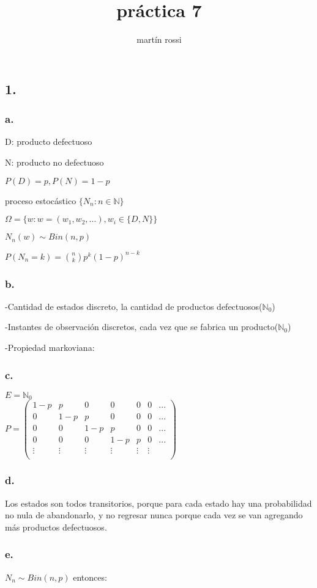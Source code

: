 \documentclass[12pt,fleqn]{article}
\title{práctica 7}
\author{martín rossi}
\date{}
\begin{document}
\maketitle
\subsection*{1.}
\subsubsection*{a.}
D: producto defectuoso

N: producto no defectuoso

$P(D)=p, P(N)=1-p$

proceso estocástico $\{N_n:n\in\mathbb{N}\}$

$\Omega=\{w:w=(w_1,w_2,...), w_i\in\{D,N\}\}$

$N_n(w)\sim Bin(n,p)$

$P(N_n=k)=\binom{n}{k}p^k(1-p)^{n-k}$
\subsubsection*{b.}
-Cantidad de estados discreto, la cantidad de productos defectuosos($\mathbb{N}_0$)

-Instantes de observación discretos, cada vez que se fabrica un producto($\mathbb{N}_0$)

-Propiedad markoviana:
\subsubsection*{c.}
$E=\mathbb{N}_0$\\

$P=\begin{pmatrix}
  1-p&p&0&0&0&0&...\\
  0&1-p&p&0&0&0&...\\
  0&0&1-p&p&0&0&...\\
  0&0&0&1-p&p&0&...\\
  \vdots&\vdots&\vdots&\vdots&\vdots&\vdots&\\
\end{pmatrix}$
\subsubsection*{d.}
Los estados son todos transitorios, porque para cada estado hay una probabilidad no nula de abandonarlo, y no regresar nunca porque cada vez se van agregando más productos defectuosos.
\subsubsection*{e.}
$N_n \sim Bin(n,p)$ entonces:
\end{document}
